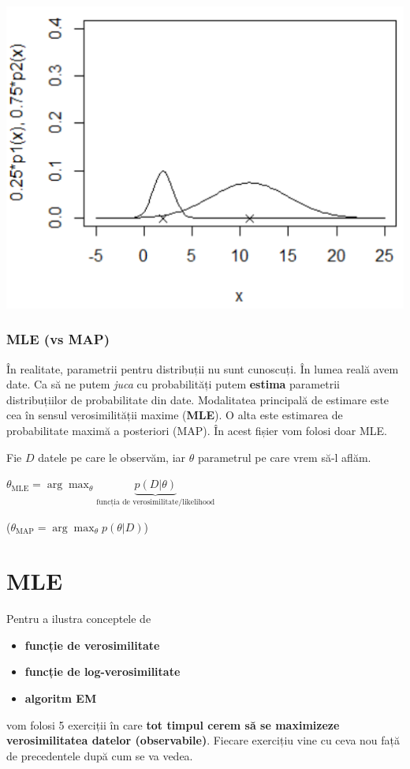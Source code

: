 \documentclass[12pt]{article}
\begin{document}
	\begin{center}
		\includegraphics{screenshot004}
	\end{center}
	
	\subsubsection{MLE (vs MAP)}	
	
	În realitate, parametrii pentru distribuții nu sunt cunoscuți. În lumea reală avem date. Ca să ne putem \textit{juca} cu probabilități putem \textbf{estima} parametrii distribuțiilor de probabilitate din date. Modalitatea principală de estimare este cea în sensul verosimilității maxime (\textbf{MLE}). O alta este estimarea de probabilitate maximă a posteriori (MAP). În acest fișier vom folosi doar MLE.
	
	\noindent Fie $D$ datele pe care le observăm, iar $\theta$ parametrul pe care vrem să-l aflăm.
	
	$\theta_\text{MLE} = \arg \max_\theta \underbrace{p(D|\theta)}_{\text{funcția de verosimilitate/likelihood}}$
	
	($\theta_\text{MAP} = \arg \max_\theta p(\theta|D)$)
	
	\section{MLE}
	Pentru a ilustra conceptele de 
	\begin{itemize}
		\item \textbf{funcție de verosimilitate}
		\item \textbf{funcție de log-verosimilitate}
		\item \textbf{algoritm EM}
	\end{itemize}
	vom folosi 5 exerciții în care \textbf{tot timpul cerem să se maximizeze verosimilitatea datelor (observabile)}. Fiecare exercițiu vine cu ceva nou față de precedentele după cum se va vedea.
	
\end{document}

